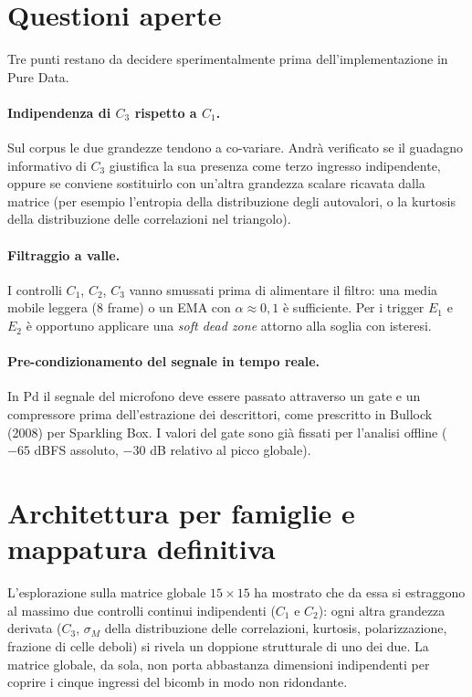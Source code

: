 \documentclass[a4paper,11pt]{article}
\begin{document}
\section{Questioni aperte}

Tre punti restano da decidere sperimentalmente prima dell'implementazione
in Pure Data.

\paragraph{Indipendenza di $C_3$ rispetto a $C_1$.}
Sul corpus le due grandezze tendono a co-variare. Andrà verificato se il
guadagno informativo di $C_3$ giustifica la sua presenza come terzo
ingresso indipendente, oppure se conviene sostituirlo con un'altra
grandezza scalare ricavata dalla matrice (per esempio l'entropia della
distribuzione degli autovalori, o la kurtosis della distribuzione delle
correlazioni nel triangolo).

\paragraph{Filtraggio a valle.}
I controlli $C_1$, $C_2$, $C_3$ vanno smussati prima di alimentare il
filtro: una media mobile leggera (8 frame) o un EMA con $\alpha \approx
0{,}1$ è sufficiente. Per i trigger $E_1$ e $E_2$ è opportuno applicare
una \emph{soft dead zone} attorno alla soglia con isteresi.

\paragraph{Pre-condizionamento del segnale in tempo reale.}
In Pd il segnale del microfono deve essere passato attraverso un gate e
un compressore prima dell'estrazione dei descrittori, come prescritto
in Bullock (2008) per Sparkling Box. I valori del gate sono già fissati
per l'analisi offline ($-65$ dBFS assoluto, $-30$ dB relativo al picco
globale).

\section{Architettura per famiglie e mappatura definitiva}

L'esplorazione sulla matrice globale $15 \times 15$ ha mostrato che da essa
si estraggono al massimo due controlli continui indipendenti ($C_1$ e
$C_2$): ogni altra grandezza derivata ($C_3$, $\sigma_M$ della
distribuzione delle correlazioni, kurtosis, polarizzazione, frazione di
celle deboli) si rivela un doppione strutturale di uno dei due. La
matrice globale, da sola, non porta abbastanza dimensioni indipendenti
per coprire i cinque ingressi del bicomb in modo non ridondante.
\end{document}
